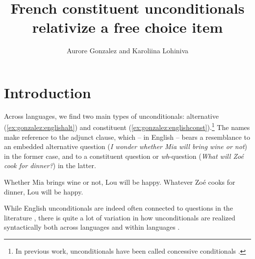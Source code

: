 \documentclass[output=paper]{langscibook}
\title{French constituent unconditionals relativize a free choice item}
\author{Aurore Gonzalez\affiliation{Harvard University} and Karoliina Lohiniva\affiliation{New York University}}
\begin{document}
\maketitle

\section{Introduction}\label{sec:gonzalez:1}

Across languages, we find two main types of unconditionals: alternative (\ref{ex:gonzalez:englishalt}) and constituent (\ref{ex:gonzalez:englishconst}).\footnote{In previous work, unconditionals have been called concessive conditionals \citep{haspelmathkonig1998}.} The names make reference to the adjunct clause, which -- in English -- bears a resemblance to an embedded alternative question (\emph{I wonder whether Mia will bring wine or not}) in the former case, and to a constituent question or \emph{wh}-question (\emph{What will Zoé cook for dinner?}) in the latter. 

\ea\label{ex:gonzalez:english}
    \ea Whether Mia brings wine or not, Lou will be happy. \label{ex:gonzalez:englishalt} 
    \ex Whatever Zoé cooks for dinner, Lou will be happy.
    \label{ex:gonzalez:englishconst}
    \z 
\z 

While English unconditionals are indeed often connected to questions in the literature \citep{haspelmathkonig1998, rawlins2013}, there is quite a lot of variation in how unconditionals are realized syntactically both across languages \citep{haspelmathkonig1998, quer2009, rawlins2013, lohiniva2019, simik2018, szabolcsi2018, falausnicolae2020, balusu2019} and within languages  \citep{quer2009,simik2018}. 
\end{document}
